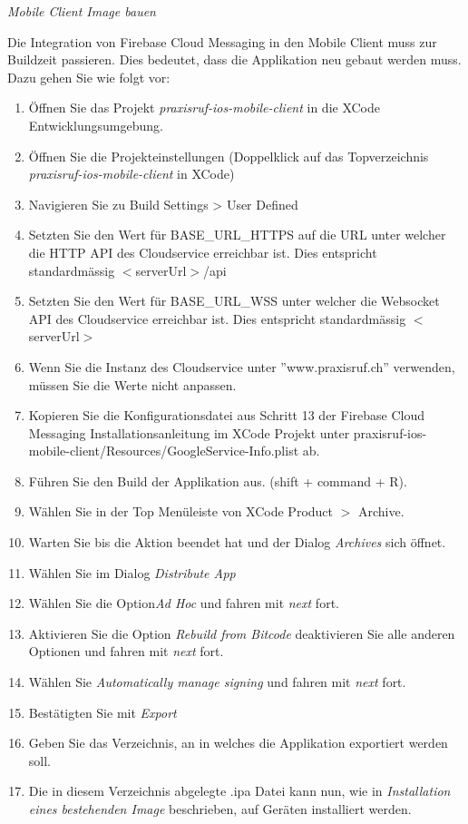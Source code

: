 \textit{Mobile Client Image bauen}

Die Integration von Firebase Cloud Messaging in den Mobile Client muss zur Buildzeit passieren.
Dies bedeutet, dass die Applikation neu gebaut werden muss.
Dazu gehen Sie wie folgt vor:

\begin{enumerate}
    \item Öffnen Sie das Projekt \textit{praxisruf-ios-mobile-client} in die XCode Entwicklungsumgebung.
    \item Öffnen Sie die Projekteinstellungen (Doppelklick auf das Topverzeichnis \textit{praxisruf-ios-mobile-client} in XCode)
    \item Navigieren Sie zu Build Settings > User Defined
    \item Setzten Sie den Wert für BASE\_URL\_HTTPS auf die URL unter welcher die HTTP API des Cloudservice erreichbar ist. Dies entspricht standardmässig $<$serverUrl$>$/api
    \item Setzten Sie den Wert für BASE\_URL\_WSS unter welcher die Websocket API des Cloudservice erreichbar ist. Dies entspricht standardmässig $<$serverUrl$>$
    \item Wenn Sie die Instanz des Cloudservice unter ''www.praxisruf.ch'' verwenden, müssen Sie die Werte nicht anpassen.
    \item Kopieren Sie die Konfigurationsdatei aus Schritt 13 der Firebase Cloud Messaging Installationsanleitung im XCode Projekt unter praxisruf-ios-mobile-client/Resources/GoogleService-Info.plist ab.
    \item Führen Sie den Build der Applikation aus. (shift + command + R).
    \item Wählen Sie in der Top Menüleiste von XCode Product $>$ Archive.
    \item Warten Sie bis die Aktion beendet hat und der Dialog \textit{Archives} sich öffnet.
    \item Wählen Sie im Dialog \textit{Distribute App}
    \item Wählen Sie die Option\textit{Ad Hoc} und fahren mit \textit{next} fort.
    \item Aktivieren Sie die Option \textit{Rebuild from Bitcode} deaktivieren Sie alle anderen Optionen und fahren mit \textit{next} fort.
    \item Wählen Sie \textit{Automatically manage signing} und fahren mit \textit{next} fort.
    \item Bestätigten Sie mit \textit{Export}
    \item Geben Sie das Verzeichnis, an in welches die Applikation exportiert werden soll.
    \item Die in diesem Verzeichnis abgelegte .ipa Datei kann nun, wie in \textit{Installation eines bestehenden Image} beschrieben, auf Geräten installiert werden.
\end{enumerate}


\clearpage
